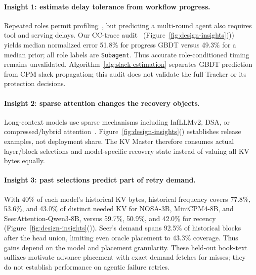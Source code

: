 \paragraph{Insight 1: estimate delay tolerance from workflow progress.}
Repeated roles permit profiling~\cite{yu2026pythia}, but predicting a
multi-round agent also requires tool and serving delays. Our CC-trace
audit~\cite{semianalysis2026cctraces}
(Figure~\ref{fig:design-insights}()) yields median normalized error
51.8\% for progress GBDT versus 49.3\% for a median prior; all role labels
are \texttt{Subagent}. Thus accurate role-conditioned timing remains
unvalidated. Algorithm~\ref{alg:slack-estimation} separates GBDT
prediction from CPM slack propagation; this audit does not validate
the full Tracker or its protection decisions.

\paragraph{Insight 2: sparse attention changes the recovery objects.}
Long-context models use sparse mechanisms including InfLLMv2,
DSA, or compressed/hybrid attention~\cite{minicpm4model,
openbmb2025minicpm41,deepseek2025v32exp,deepseek2025v32model,
zai2026glm5model,openbmb2026sala,deepseek2026v4model,minimax2026m3,
zai2026glm52,longcat2026sparse}.
Figure~\ref{fig:design-insights}()
establishes release examples, not deployment share.
The KV Master therefore consumes actual layer/block selections and
model-specific recovery state instead of valuing all KV bytes equally.

\paragraph{Insight 3: past selections predict part of retry demand.}
With 40\% of each model's historical KV bytes, historical frequency
covers 77.8\%, 53.6\%, and 43.0\% of distinct needed KV for NOSA-3B,
MiniCPM4-8B, and SeerAttention-Qwen3-8B, versus 59.7\%, 50.9\%, and
42.0\% for recency
(Figure~\ref{fig:design-insights}()).
Seer's demand spans 92.5\% of historical blocks after the head union,
limiting even oracle placement to 43.3\% coverage. Thus gains depend on
the model and placement granularity. These held-out book-text suffixes
motivate advance placement with exact demand fetches for misses;
they do not establish performance on agentic failure retries.
